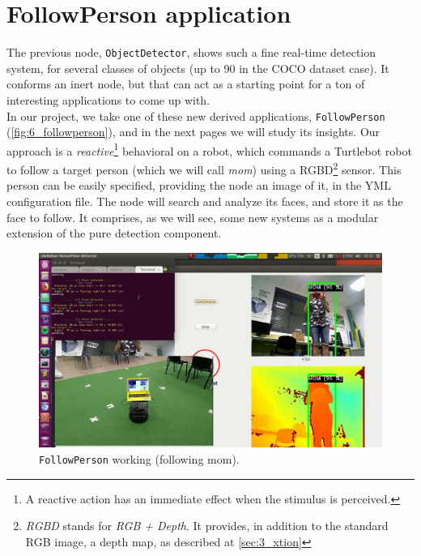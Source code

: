 \chapter{FollowPerson application}
\label{chap:followperson}

	The previous node, \texttt{ObjectDetector}, shows such a fine real-time detection system, for several classes of objects (up to 90 in the COCO dataset case). It conforms an inert node, but that can act as a starting point for a ton of interesting applications to come up with.\\
	
	In our project, we take one of these new derived applications, \texttt{FollowPerson} (\autoref{fig:6_followperson}), and in the next pages we will study its insights. Our approach is a \emph{reactive}\footnote{A reactive action has an immediate effect when the stimulus is perceived.} behavioral on a robot, which commands a Turtlebot robot to follow a target person (which we will call \emph{mom}) using a RGBD\footnote{\emph{RGBD} stands for \emph{RGB + Depth}. It provides, in addition to the standard RGB image, a depth map, as described at \ref{sec:3_xtion}} sensor. This person can be easily specified, providing the node an image of it, in the YML configuration file. The node will search and analyze its faces, and store it as the face to follow. It comprises, as we will see, some new systems as a modular extension of the pure detection component.
	
	\begin{figure}[h]
		\centering
		\includegraphics[width=6in]{images/followperson_working}
		\caption{\texttt{FollowPerson} working (following mom).}
		\label{fig:6_followperson}
	\end{figure}
	
